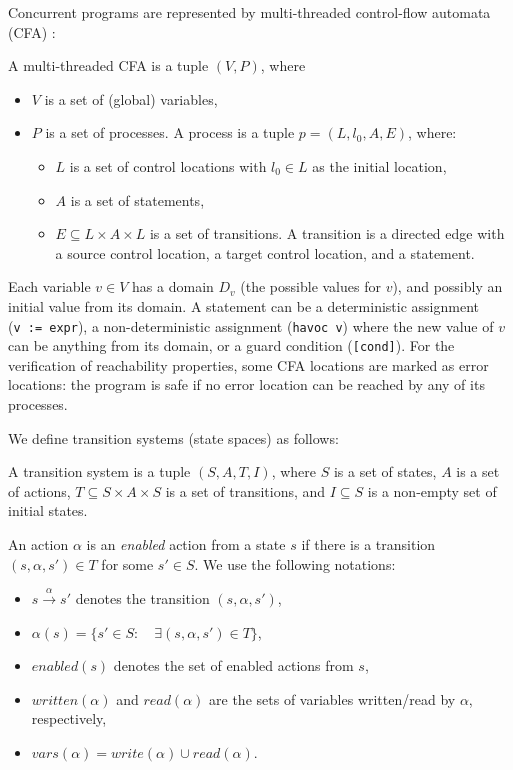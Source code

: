 \documentclass[numbook]{svjour3}
\begin{document}
Concurrent programs are represented by multi-threaded control-flow automata (CFA) \cite{spin25coi}:

\begin{definition}%
    A multi-threaded CFA is a tuple $(V, P)$, where
    \begin{itemize}
        \item $V$ is a set of (global) variables,
        \item $P$ is a set of processes. A process is a tuple $p = (L, l_0, A, E)$, where:
        \begin{itemize}
            \item $L$ is a set of control locations with $l_0 \in L$ as the initial location,
            \item $A$ is a set of statements,			
            \item $E \subseteq L \times \mathit{A} \times L$ is a set of transitions. A transition is a directed edge with a source control location, a target control location, and a statement.
        \end{itemize}
    \end{itemize}
\end{definition}

Each variable $v \in V$ has a domain $D_v$ (the possible values for $v$), and possibly an initial value from its domain. A statement can be a deterministic assignment (\texttt{v~:=~expr}), a non-deterministic assignment (\texttt{havoc v}) where the new value of $v$ can be anything from its domain, or a guard condition (\texttt{[cond]}). For the verification of reachability properties, some CFA locations are marked as error locations: the program is safe if no error location can be reached by any of its processes.

We define transition systems (state spaces) as follows:

\begin{definition}%
	A transition system is a tuple $(S, A, T, I)$, where $S$ is a set of states, $A$ is a set of actions, $T \subseteq S \times A \times S$ is a set of transitions, and $I \subseteq S$ is a non-empty set of initial states.
\end{definition}

An action $\alpha$ is an \emph{enabled} action from a state $s$ if there is a transition $(s, \alpha, s') \in T$ for some $s' \in S$. We use the following notations:
\begin{itemize}
	\item $s \xrightarrow{\alpha} s'$ denotes the transition $(s, \alpha, s')$,
	\item $\alpha(s) = \{s' \in S : \quad \exists (s, \alpha, s') \in T\}$,
	\item $\mathit{enabled}(s)$ denotes the set of enabled actions from $s$,
	\item $\mathit{written}(\alpha)$ and $\mathit{read}(\alpha)$ are the sets of variables written/read by $\alpha$, respectively,
	\item $\mathit{vars}(\alpha) = \mathit{write}(\alpha) \cup \mathit{read}(\alpha)$.
\end{itemize}
\end{document}
